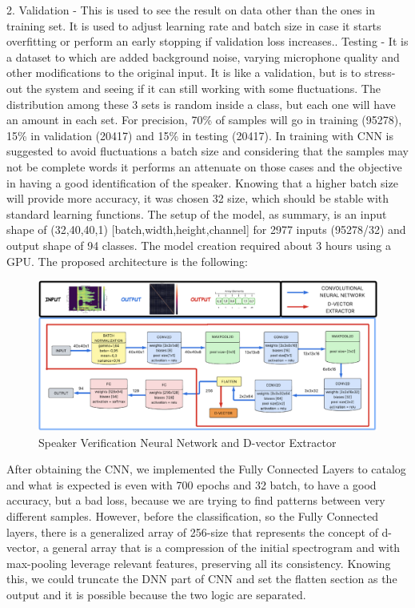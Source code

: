 2. Validation - This is used to see the result on data other than the ones in training set. It is used to adjust learning rate and batch size in case it starts overfitting or perform an early stopping if validation loss increases.. Testing - It is a dataset to which are added background noise, varying microphone quality and other modifications to the original input. It is like a validation, but is to stress-out the system and seeing if it can still working with some fluctuations.\newline\newline
The distribution among these 3 sets is random inside a class, but each one will have an amount in each set. For precision, 70\% of samples will go in training (95278), 15\% in validation (20417) and 15\% in testing (20417). In training with CNN is suggested to avoid fluctuations a batch size and considering that the samples may not be complete words it performs an attenuate on those cases and the objective in having a good identification of the speaker. Knowing that a higher batch size will provide more accuracy, it was chosen 32 size, which should be stable with standard learning functions.\newline
The setup of the model, as summary, is an input shape of (32,40,40,1) [batch,width,height,channel] for 2977 inputs (95278/32) and output shape of 94 classes. The model creation required about 3 hours using a GPU. The proposed architecture is the following\cite{dvector_extractor_TinySV}:
\begin{center}
    \begin{figure}[!h]
        \centering
        \includegraphics[width=1.0\textwidth]{images/3.02 D-vector Extractor.png}
        \caption{Speaker Verification Neural Network and D-vector Extractor}
    \end{figure}
\end{center}
After obtaining the CNN, we implemented the Fully Connected Layers to catalog and what is expected is even with 700 epochs and 32 batch, to have a good accuracy, but a bad loss, because we are trying to find patterns between very different samples. However, before the classification, so the Fully Connected layers, there is a generalized array of 256-size that represents the concept of d-vector, a general array that is a compression of the initial spectrogram and with max-pooling leverage relevant features, preserving all its consistency. Knowing this, we could truncate the DNN part of CNN and set the flatten section as the output and it is possible because the two logic are separated.\newline
